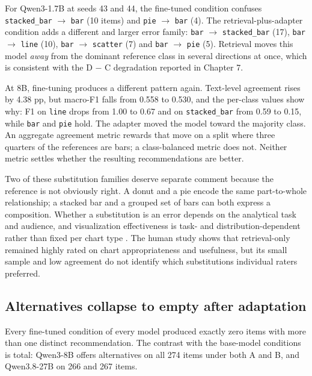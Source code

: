 For Qwen3-1.7B at seeds 43 and 44, the fine-tuned condition confuses \texttt{stacked\_bar} \(\rightarrow\) \texttt{bar} (10 items) and \texttt{pie} \(\rightarrow\) \texttt{bar} (4). The retrieval-plus-adapter condition adds a different and larger error family: \texttt{bar} \(\rightarrow\) \texttt{stacked\_bar} (17), \texttt{bar} \(\rightarrow\) \texttt{line} (10), \texttt{bar} \(\rightarrow\) \texttt{scatter} (7) and \texttt{bar} \(\rightarrow\) \texttt{pie} (5). Retrieval moves this model \emph{away} from the dominant reference class in several directions at once, which is consistent with the D \ensuremath{-} C degradation reported in Chapter 7.

At 8B, fine-tuning produces a different pattern again. Text-level agreement rises by 4.38 pp, but macro-F1 falls from 0.558 to 0.530, and the per-class values show why: F1 on \texttt{line} drops from 1.00 to 0.67 and on \texttt{stacked\_bar} from 0.59 to 0.15, while \texttt{bar} and \texttt{pie} hold. The adapter moved the model toward the majority class. An aggregate agreement metric rewards that move on a split where three quarters of the references are bars; a class-balanced metric does not. Neither metric settles whether the resulting recommendations are better.

Two of these substitution families deserve separate comment because the reference is not obviously right. A donut and a pie encode the same part-to-whole relationship; a stacked bar and a grouped set of bars can both express a composition. Whether a substitution is an error depends on the analytical task and audience, and visualization effectiveness is task- and distribution-dependent rather than fixed per chart type \cite{saket2019taskbased,kim2018taskdata}. The human study shows that retrieval-only remained highly rated on chart appropriateness and usefulness, but its small sample and low agreement do not identify which substitutions individual raters preferred.

\subsection{Alternatives collapse to empty after adaptation}

Every fine-tuned condition of every model produced exactly zero items with more than one distinct recommendation. The contrast with the base-model conditions is total: Qwen3-8B offers alternatives on all 274 items under both A and B, and Qwen3.8-27B on 266 and 267 items.

